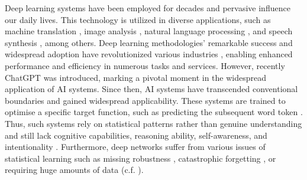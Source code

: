Deep learning systems have been employed for decades \cite{ivakhnenko_cybernetic_1965} and pervasive influence our daily lives. This technology is utilized in diverse applications, such as machine translation \cite{dabre_survey_2021}, image analysis \cite{bhatt_cnn_2021}, natural language processing \cite{otter_survey_2021}, and speech synthesis \cite{ning_review_2019}, among others. Deep learning methodologies' remarkable success and widespread adoption have revolutionized various industries \cite{bertolini_machine_2021}, enabling enhanced performance and efficiency in numerous tasks and services.
However, recently ChatGPT \cite{liu_summary_2023} was introduced, marking a pivotal moment in the widespread application of AI systems.
Since then, AI systems have transcended conventional boundaries and gained widespread applicability. %
These systems are trained to optimise a specific target function, such as predicting the subsequent word token .
Thus, such systems rely on statistical patterns rather than genuine understanding and still lack cognitive capabilities, reasoning ability, self-awareness, and intentionality .
Furthermore, deep networks suffer from various issues of statistical learning such as missing robustness , catastrophic forgetting , or requiring huge amounts of data  (c.f. ).

